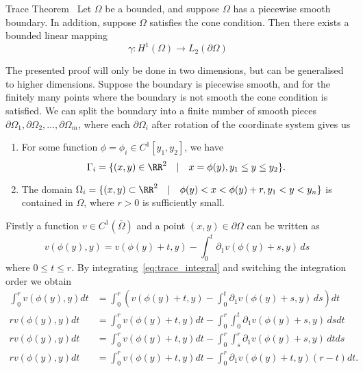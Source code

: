 \begin{thmx}{Trace Theorem}~\label{thm:trace}
    Let $\Omega$ be a bounded, and suppose $\Omega$ has a piecewise smooth boundary. In addition, suppose $\Omega$ satisfies the cone condition. Then there exists a bounded linear mapping 
    \begin{equation*}
        \gamma : H^1(\Omega) \to L_2(\partial \Omega)
    \end{equation*}
\end{thmx}
\begin{bev}
    The presented proof will only be done in two dimensions, but can be generalised to higher dimensions.
    Suppose the boundary is piecewise smooth, and for the finitely many points where the boundary is not smooth the cone condition is satisfied. We can split the boundary into a finite number of smooth pieces $\partial \Omega_1, \partial \Omega_2, \dots, \partial \Omega_m$, where each $\partial \Omega_i$ after rotation of the coordinate system gives us
    \begin{enumerate}
        \item For some function $\phi = \phi_i \in C^1[y_1, y_2]$, we have
            \[ \Gamma_i = \{ (x,y) \in \RR^2 \quad | \quad x = \phi(y), y_1 \leq y \leq y_2 \}. \]
        \item The domain $\Omega_i = \{ (x,y) \subset \RR^2 \quad | \quad \phi(y) < x <\phi(y) + r, y_1 < y < y_n \}$ is contained in $\Omega$, where $r > 0$ is sufficiently small. 
    \end{enumerate}
    Firstly a function $v \in C^1(\bar{\Omega})$ and a point $(x,y) \in \partial \Omega$ can be written as
    \begin{equation}
            v(\phi(y), y) = v(\phi(y) + t, y) - \int_0^t \partial_1 v(\phi(y) + s, y) \, ds~\label{eq:trace_integral}
    \end{equation}
    where $0 \leq t \leq r$. By integrating~\eqref{eq:trace_integral} and switching the integration order we obtain 
    \begin{align*}
        \int_0^r v(\phi(y), y) dt &= \int_0^r \left(   v(\phi(y) + t, y) - \int_0^t \partial_1 v(\phi(y) + s, y) \, ds \right) dt \\
        r v(\phi(y), y) dt &= \int_0^r   v(\phi(y) + t, y) dt - \int_0^r \int_0^t \partial_1 v(\phi(y) + s, y) \, ds dt \\
        r v(\phi(y), y) dt &= \int_0^r   v(\phi(y) + t, y) dt - \int_0^r \int_s^r \partial_1 v(\phi(y) + s, y) \, dt ds \\
        r v(\phi(y), y) dt &= \int_0^r v(\phi(y) + t, y) dt - \int_0^r \partial_1 v(\phi(y) + t, y)(r-t) dt.

\end{align*}
\end{bev}
